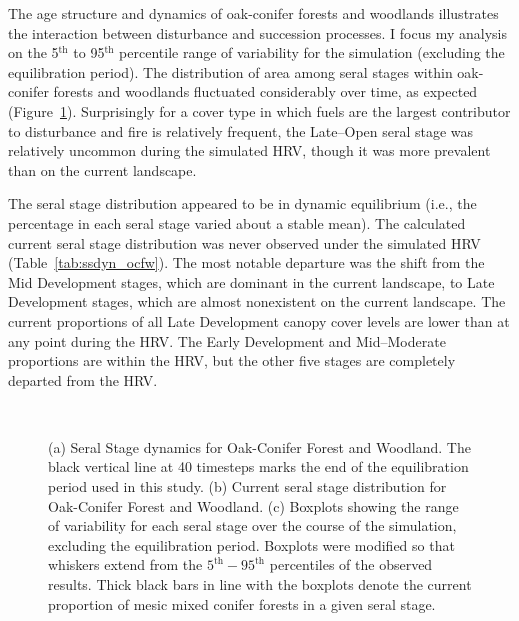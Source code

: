 The age structure and dynamics of oak-conifer forests and woodlands illustrates the interaction between disturbance and succession processes. I focus my analysis on the 5$^{\text{th}}$ to 95$^{\text{th}}$ percentile range of variability for the simulation (excluding the equilibration period). %
%
The distribution of area among seral stages within oak-conifer forests and woodlands fluctuated considerably over time, as expected (Figure~\ref{fig:covcond_ocfw}). Surprisingly for a cover type in which fuels are the largest contributor to disturbance and fire is relatively frequent, the Late--Open seral stage was relatively uncommon during the simulated HRV, though it was more prevalent than on the current landscape.
%

The seral stage distribution appeared to be in dynamic equilibrium (i.e., the percentage in each seral stage varied about a stable mean). The calculated current seral stage distribution was never observed under the simulated HRV (Table~\ref{tab:ssdyn_ocfw}). The most notable departure was the shift from the Mid Development stages, which are dominant in the current landscape, to Late Development stages, which are almost nonexistent on the current landscape. The current proportions of all Late Development canopy cover levels are lower than at any point during the HRV.  The Early Development and Mid--Moderate proportions are within the HRV, but the other five stages are completely departed from the HRV.

\begin{figure}[!htbp]
  \centering
  \\
  \caption{(a) Seral Stage dynamics for Oak-Conifer Forest and Woodland. The black vertical line at 40 timesteps marks the end of the equilibration period used in this study. (b) Current seral stage distribution for Oak-Conifer Forest and Woodland. (c) Boxplots showing the range of variability for each seral stage over the course of the simulation, excluding the equilibration period. Boxplots were modified so that whiskers extend from the $5^{\text{th}} - 95^{\text{th}}$ percentiles of the observed results. Thick black bars in line with the boxplots denote the current proportion of mesic mixed conifer forests in a given seral stage.} 
  \label{fig:covcond_ocfw}
\end{figure}

